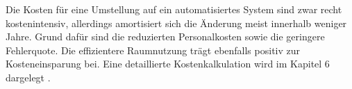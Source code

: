 	Die Kosten für eine Umstellung auf ein automatisiertes System sind zwar recht kostenintensiv, allerdings amortisiert sich die Änderung meist innerhalb weniger Jahre. Grund dafür sind die reduzierten Personalkosten sowie die geringere Fehlerquote. Die effizientere Raumnutzung trägt ebenfalls positiv zur Kosteneinsparung bei. Eine detaillierte Kostenkalkulation wird im Kapitel 6 dargelegt \autocite{ohra_automatisierte_2024}.
	
	
